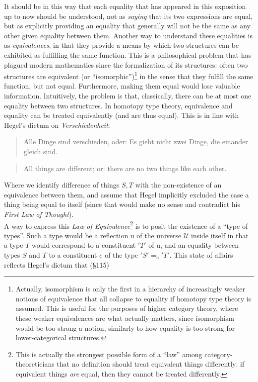 \documentclass{article}
\begin{document}
It should be in this way that each equality that has appeared in this exposition up to now should be understood,
not as \emph{saying} that its two expressions are equal, but as explicitly providing an equality that
generally will not be the same as any other given equality between them. Another way to understand these
equalities is as \emph{equivalences}, in that they provide a means by which two structures can be exhibited
as fulfilling the same function. This is a philosophical problem that has plagued modern mathematics since
the formalization of its structures: often two structures are equivalent (or ``isomorphic'')\footnote{Actually,
isomorphism is only the first in a hierarchy of increasingly weaker notions of equivalence that all collapse
to equality if homotopy type theory is assumed. This is useful for the purposes of higher category theory,
where these weaker equivalences are what actually matters, since isomorphism would be too strong a notion,
similarly to how equality is too strong for lower-categorical structures.} in the sense that they fulfill
the same function, but not equal. Furthermore, making them equal would lose valuable information. Intuitively,
the problem is that, classically, there can be at most one equality between two structures. In homotopy
type theory, equivalence and equality can be treated equivalently (and are thus equal). This is in line
with Hegel's dictum on \emph{Verschiedenheit}:

\begin{quote}
   Alle Dinge sind verschieden, oder: Es giebt nicht zwei Dinge, die einander gleich sind.
\end{quote}

\begin{quote}
    All things are different; or: there are no two things like each other.
\end{quote}

Where we identify difference of things $S,T$ with the non-existence of an equivalence between them, and
assume that Hegel implicitly excluded the case a thing being equal to itself (since that would make no
sense and contradict his \emph{First Law of Thought}). \\

A way to express this \emph{Law of Equivalence}\footnote{This is actually the strongest possible form
of a ``law'' among category-theoreticians that no definition should treat equivalent things differently:
if equivalent things \emph{are} equal, then they cannot be treated differently.} is to posit the existence
of a ``type of types''. Such a type would be a reflection $\mathrm{u}$ of the universe $\mathcal{U}$ inside
itself in that a type $T$ would correspond to a constituent $'T'$ of $\mathrm{u}$, and an equality between
types $S$ and $T$ to a constituent $e$ of the type $'S'=_{\mathrm{u}} 'T'$. This state of affairs reflects
Hegel's dictum that (§115)
\end{document}
